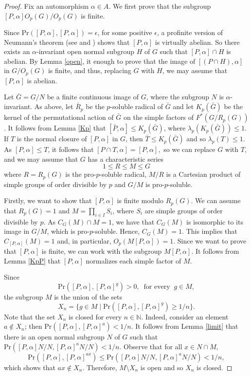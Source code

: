 \documentclass[12pt]{amsart}
\newcommand{\N}{\mathbb{N}}
\newcommand{\al }{\alpha }
\newcommand{\pr }{\mathrm{Pr} }
\begin{document}
\begin{proof}  
Fix an automorphism $\al \in A$. We first prove that the subgroup $[P,\al]O_p(G)/O_p(G)$ is finite. 

Since $ \pr([P,\alpha], [P,\alpha])=\epsilon$, for some positive $\epsilon$, a profinite version of  Neumann's theorem (see \cite{neumann} and \cite{LP}) shows that  $[P,\alpha]$ is  virtually abelian. So there exists an $\alpha$-invariant open normal subgroup $H$ of $G$ such that $[P,\alpha]\cap H$ is abelian. 
 By Lemma \ref{open}, 
 it enough to prove that the image of $[(P\cap H),\alpha]$ in $G/O_p(G)$ is finite, and thus, replacing $G$ with $H$, 
we may assume that $[P,\alpha]$ is abelian. 

Let $\bar G=G/N$ be a finite continuous image of $G$, where the subgroup $N$ is $\alpha$-invariant. As above, let $\bar R_p$ be the $p$-soluble radical of $\bar G$ and let $K_p(\bar G)$ be the kernel of the permutational action of $\bar G$ on the simple factors of $F^*(G/R_p(G))$. It follows from Lemma \ref{Kp} that $[\bar P,\alpha]\le K_p(\bar G)$, where $\lambda_p(K_p(\bar G))\le 1$.
 If  $T$ is the normal closure of $[P,\alpha]$ in $G$, then $\bar T\le  K_p(\bar G)$ and so $\lambda_p(T)\le1.$
As $[P,\alpha]\le T$, it follows that $[P\cap T,\alpha]= [P,\alpha],$ so we can replace $G$ with $T$, and we may assume that $G$ has a characteristic series
\[1\le R\le M\le G\]
where $R=R_p(G)$ is the pro-$p$-soluble radical, $M/R$ is a Cartesian product of simple groups of order divisible by $p$ and $G/M$ is pro-$p$-soluble. 

 Firstly, we want to show that $[P,\alpha]$ is finite modulo $R_p(G)$. 
 We  can assume that $R_p(G)=1$ and $M=\prod_{i\in I} S_i$, where $S_i$ are
 simple groups of order divisible by $p$. As $C_G(M)\cap M=1$, we have that $C_G(M)$ is isomorphic to its image in $G/M$, which is pro-$p$-soluble. Hence, $C_G(M)=1$. This implies that $C_{[P,\alpha]}(M)=1$ and, in particular, $O_p(M[P,\alpha])=1$. Since we want to prove that $[P,\al]$ is finite, we can work with the subgroup $M[P,\al]$. It follows from Lemma \ref{KpP} that  $[P,\al]$ normalizes each simple factor of $M$. 

Since 
\[ \pr([P,\alpha], [P,\alpha]^g) >0, \ \textrm{ for every } \ g \in M, \]
the subgroup $M$ is the union of  the sets
  \[ X_n=\{g \in M \mid \pr([P,\alpha], [P,\alpha]^g) \ge 1/n\}. \]
Note that the set $X_n$ is closed for every $n \in \N$. Indeed, 
 consider an element $a \notin X_n$; then $\pr([P,\alpha], [P,\alpha]^a) < 1/n$. It follows from Lemma \ref{limit}
 that there is an open normal subgroup $N$ of $G$ such that $ \pr ([P,\alpha]N/N, [P,\alpha]^{a}N/N)  < 1/n$. Observe that for all $x \in N \cap M$, 
   \[ \pr([P,\alpha], [P,\alpha]^{ax}) \le  \pr ([P,\alpha]N/N, [P,\alpha]^{a}N/N) < 1/n, \] 
   which shows that $ax \notin X_n$. Therefore, $M \setminus X_n$ is open and so $X_n$ is closed.


\end{proof}
\end{document}
